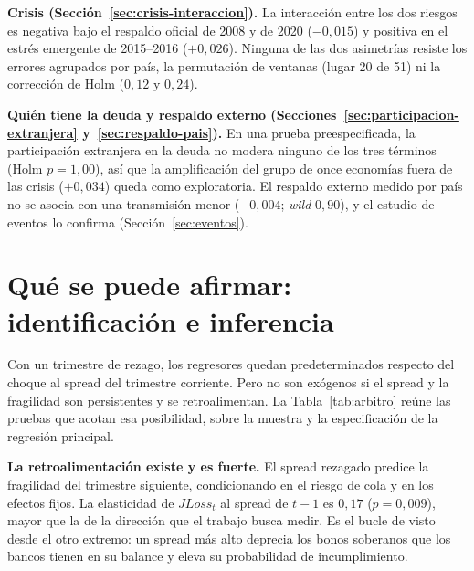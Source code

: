 \textbf{Crisis (Sección~\ref{sec:crisis-interaccion}).} La interacción entre los dos riesgos es negativa bajo el respaldo oficial de 2008 y de 2020 ($-0{,}015$) y positiva en el estrés emergente de 2015--2016 ($+0{,}026$). Ninguna de las dos asimetrías resiste los errores agrupados por país, la permutación de ventanas (lugar 20 de 51) ni la corrección de Holm ($0{,}12$ y $0{,}24$).

\textbf{Quién tiene la deuda y respaldo externo (Secciones~\ref{sec:participacion-extranjera} y~\ref{sec:respaldo-pais}).} En una prueba preespecificada, la participación extranjera en la deuda no modera ninguno de los tres términos (Holm $p=1{,}00$), así que la amplificación del grupo de once economías fuera de las crisis ($+0{,}034$) queda como exploratoria. El respaldo externo medido por país no se asocia con una transmisión menor ($-0{,}004$; \textit{wild} $0{,}90$), y el estudio de eventos lo confirma (Sección~\ref{sec:eventos}).

\section{Qué se puede afirmar: identificación e inferencia}
\label{sec:identificacion}

Con un trimestre de rezago, los regresores quedan predeterminados respecto del choque al spread del trimestre corriente. Pero no son exógenos si el spread y la fragilidad son persistentes y se retroalimentan. La Tabla~\ref{tab:arbitro} reúne las pruebas que acotan esa posibilidad, sobre la muestra y la especificación de la regresión principal.



\textbf{La retroalimentación existe y es fuerte.} El spread rezagado predice la fragilidad del trimestre siguiente, condicionando en el riesgo de cola y en los efectos fijos. La elasticidad de $JLoss_t$ al spread de $t-1$ es $0{,}17$ ($p=0{,}009$), mayor que la de la dirección que el trabajo busca medir. Es el bucle de \citet{FarhiTirole2018b} visto desde el otro extremo: un spread más alto deprecia los bonos soberanos que los bancos tienen en su balance y eleva su probabilidad de incumplimiento.

